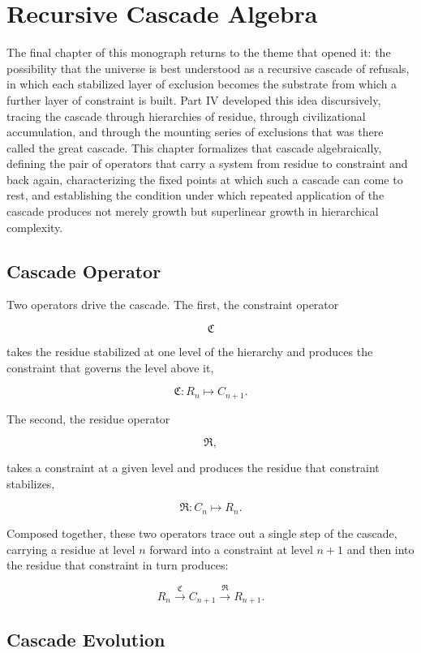 \documentclass[11pt,oneside]{book}
\theoremstyle{plain}
\theoremstyle{definition}
\theoremstyle{remark}
\begin{document}
\chapter{Recursive Cascade Algebra}

The final chapter of this monograph returns to the theme that opened it: the possibility that the universe is best understood as a recursive cascade of refusals, in which each stabilized layer of exclusion becomes the substrate from which a further layer of constraint is built. Part IV developed this idea discursively, tracing the cascade through hierarchies of residue, through civilizational accumulation, and through the mounting series of exclusions that was there called the great cascade. This chapter formalizes that cascade algebraically, defining the pair of operators that carry a system from residue to constraint and back again, characterizing the fixed points at which such a cascade can come to rest, and establishing the condition under which repeated application of the cascade produces not merely growth but superlinear growth in hierarchical complexity.

\section{Cascade Operator}

Two operators drive the cascade. The first, the constraint operator

\[
\mathfrak C
\]

takes the residue stabilized at one level of the hierarchy and produces the constraint that governs the level above it,

\[
\mathfrak C:
R_n
\mapsto
C_{n+1}.
\]

The second, the residue operator

\[
\mathfrak R,
\]

takes a constraint at a given level and produces the residue that constraint stabilizes,

\[
\mathfrak R:
C_n
\mapsto
R_n.
\]

Composed together, these two operators trace out a single step of the cascade, carrying a residue at level \(n\) forward into a constraint at level \(n+1\) and then into the residue that constraint in turn produces:

\[
R_n
\overset{\mathfrak C}{\longrightarrow}
C_{n+1}
\overset{\mathfrak R}{\longrightarrow}
R_{n+1}.
\]

\section{Cascade Evolution}
\end{document}
